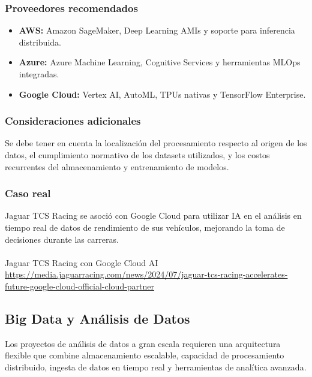 {            \subsubsection{Proveedores recomendados}
                \begin{itemize}
                    \item \textbf{AWS:} Amazon SageMaker, Deep Learning AMIs y soporte para inferencia distribuida.
                    \item \textbf{Azure:} Azure Machine Learning, Cognitive Services y herramientas MLOps integradas.
                    \item \textbf{Google Cloud:} Vertex AI, AutoML, TPUs nativas y TensorFlow Enterprise.
                \end{itemize}
                
            \subsubsection{Consideraciones adicionales}
                Se debe tener en cuenta la localización del procesamiento respecto al origen de los datos, el cumplimiento normativo de los datasets utilizados, y los costos recurrentes del almacenamiento y entrenamiento de modelos.

            \subsubsection{Caso real}
                Jaguar TCS Racing se asoció con Google Cloud para utilizar IA en el análisis en tiempo real de datos de rendimiento de sus vehículos, mejorando la toma de decisiones durante las carreras.
                \paragraph{}Jaguar TCS Racing con Google Cloud AI \href{https://media.jaguarracing.com/news/2024/07/jaguar-tcs-racing-accelerates-future-google-cloud-official-cloud-partner}{https://media.jaguarracing.com/news/2024/07/jaguar-tcs-racing-accelerates-future-google-cloud-official-cloud-partner}
        
        \subsection{Big Data y Análisis de Datos}
            Los proyectos de análisis de datos a gran escala requieren una arquitectura flexible que combine almacenamiento escalable, capacidad de procesamiento distribuido, ingesta de datos en tiempo real y herramientas de analítica avanzada.
            
}
